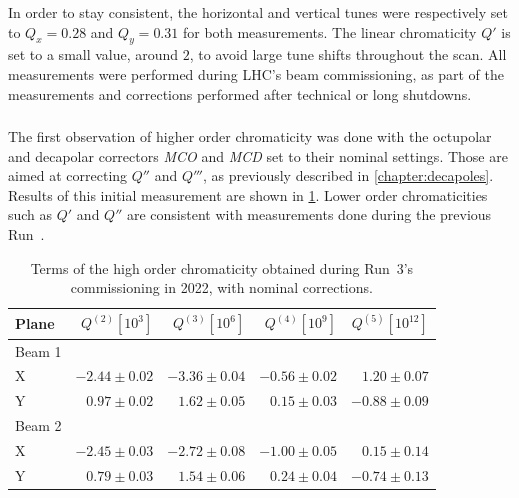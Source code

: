 In order to stay consistent, the horizontal and vertical tunes were respectively set to $Q_x = 0.28$
and $Q_y = 0.31$ for both measurements. The linear chromaticity $Q'$ is set to a small value, around
$2$, to avoid large tune shifts throughout the scan.
All measurements were performed during LHC's beam commissioning, as part of the measurements and
corrections performed after technical or long shutdowns.


\subsubsection{}

The first observation of higher order chromaticity was done with the octupolar and decapolar
correctors \textit{MCO} and \textit{MCD} set to their nominal settings. Those are aimed at
correcting $Q''$ and $Q'''$, as previously described in \cref{chapter:decapoles}.
Results of this initial measurement are shown in \cref{tab:high_orders:chroma_fidel}. Lower order
chromaticities such as $Q'$ and $Q''$ are consistent with measurements done during the previous 
Run~\cite{maclean_commissioning_2016}.

\begin{table}[!htb]
    \centering
    \begin{tabular}{lrrrr}
    \toprule
         Plane & $Q^{(2)} [10^3]$ & $Q^{(3)} [10^6]$ & $Q^{(4)} [10^9]$ & $Q^{(5)} [10^{12}]$ \\
    \midrule
        Beam 1 &              &               &              & \\
        \hspace{2mm}X         & $-2.44 \pm 0.02$ & $-3.36 \pm 0.04$ & $-0.56 \pm 0.02 $ & $ 1.20 \pm 0.07$ \\
        \hspace{2mm}Y         & $ 0.97 \pm 0.02$ & $ 1.62 \pm 0.05$ &$  0.15 \pm 0.03$ & $-0.88 \pm 0.09$ \\
        Beam 2 &              &                &                & \\
        \hspace{2mm}X         & $-2.45 \pm 0.03$ & $-2.72 \pm 0.08$ & $-1.00 \pm 0.05 $ & $ 0.15 \pm 0.14$ \\
        \hspace{2mm}Y         & $ 0.79 \pm 0.03$ & $1.54 \pm 0.06 $ & $ 0.24 \pm 0.04 $ & $-0.74 \pm 0.13$ \\
    \bottomrule
    \end{tabular}
    \caption{Terms of the high order chromaticity obtained during Run~3's commissioning in 2022,
    with nominal corrections.}
    \label{tab:high_orders:chroma_fidel}
  \end{table}

